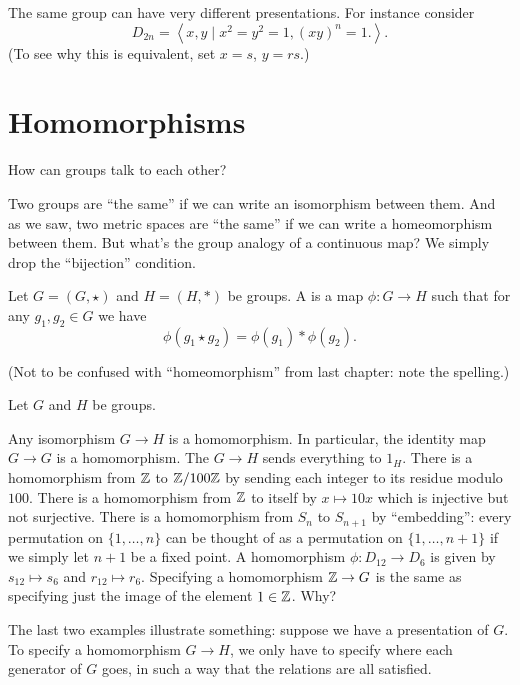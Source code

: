\begin{example}
	The same group can have very different presentations.
	For instance consider
	\[ D_{2n} = \left< x,y \mid x^2=y^2=1, (xy)^n=1. \right>. \]
	(To see why this is equivalent, set $x=s$, $y=rs$.)
\end{example}

\section{Homomorphisms}

How can groups talk to each other?

Two groups are ``the same'' if we can write an isomorphism between them.
And as we saw, two metric spaces are ``the same''
if we can write a homeomorphism between them.
But what's the group analogy of a continuous map?
We simply drop the ``bijection'' condition.

\begin{definition}
	Let $G = (G, \star)$ and $H = (H, \ast)$ be groups.
	A  is a map $\phi : G \to H$
	such that for any $g_1, g_2 \in G$ we have
	\[ \phi(g_1 \star g_2) = \phi(g_1) \ast \phi(g_2). \]
\end{definition}
(Not to be confused with ``homeomorphism'' from
last chapter: note the spelling.)

\begin{example}
	Let $G$ and $H$ be groups.
	\begin{enumerate}[(a)]
		\ii Any isomorphism $G \to H$ is a homomorphism.
		In particular, the identity map $G \to G$ is a homomorphism.
		\ii The  $G \to H$ sends
		everything to $1_H$.
		\ii There is a homomorphism from $\mathbb Z$ to $\mathbb Z/100\mathbb Z$ by
		sending each integer to its residue modulo $100$.
		\ii There is a homomorphism from $\mathbb Z$ to itself by $x \mapsto 10x$
		which is injective but not surjective.
		\ii There is a homomorphism from $S_n$ to $S_{n+1}$ by ``embedding'':
		every permutation on $\{1,\dots,n\}$ can be thought of as a permutation
		on $\{1,\dots,n+1\}$ if we simply let $n+1$ be a fixed point.
		\ii A homomorphism $\phi: D_{12} \to D_6$
		is given by $s_{12} \mapsto s_6$
		and $r_{12} \mapsto r_6$.
		\ii Specifying a homomorphism $\mathbb Z \to G$ is the same as
		specifying just the image of the element $1 \in \mathbb Z$. Why?
	\end{enumerate}
\end{example}
The last two examples illustrate something: suppose we have a presentation of $G$.
To specify a homomorphism $G \to H$, we only have to specify where each generator of $G$ goes, in such a way that the relations are all satisfied.

